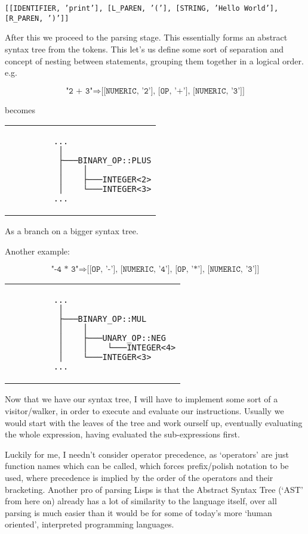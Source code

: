 \documentclass{article}
\newcommand{\code}[1]{\texttt{#1}}
\begin{document}
    \noindent\code{[[IDENTIFIER, 'print'], [L\_PAREN, '('], [STRING, 'Hello
    World'], [R\_PAREN, ')']]}

    After this we proceed to the parsing stage. This essentially forms an
    abstract syntax tree from the tokens. This let's us define some sort of
    separation and concept of nesting between statements, grouping them together
    in a logical order.\autocite{dragon}
    e.g.

    \[ \code{"2 + 3"} \Rightarrow \code{[[NUMERIC, '2'], [OP, '+'], [NUMERIC,
'3']]}  \]
    \centerline{becomes}
    \begin{center}
      \begin{tabular}{l}
        \begin{BVerbatim}
         ...
          │
          ├───BINARY_OP::PLUS
          │    │
          │    ├───INTEGER<2>
          │    └───INTEGER<3>
         ...
       \end{BVerbatim}
      \end{tabular}
      As a branch on a bigger syntax tree.
    \end{center}


    \centerline{Another example:}
    \[ \code{"-4 * 3"} \Rightarrow \code{[[OP, '-'], [NUMERIC, '4'], [OP, '*'],
[NUMERIC, '3']]}  \]
    \begin{center}
      \begin{tabular}{l}
        \begin{BVerbatim}
         ...
          │
          ├───BINARY_OP::MUL
          │    │
          │    ├───UNARY_OP::NEG
          │    │    └───INTEGER<4>
          │    └───INTEGER<3>
         ...
       \end{BVerbatim}
      \end{tabular}
    \end{center}


    Now that we have our syntax tree, I will have to implement some sort of a
    visitor/walker, in order to execute and evaluate our instructions. Usually
    we would start with the leaves of the tree and work ourself up,
    eventually evaluating the whole expression, having evaluated the
    sub-expressions first.

    Luckily for me, I needn't consider operator precedence, as `operators' are
    just function names which can be called, which forces prefix/polish notation
    to be used, where precedence is implied by the order of the operators and
    their bracketing. Another
    pro of parsing Lisps is that the Abstract Syntax Tree (`AST' from here on)
    already has a lot of similarity to the language itself, over all parsing is
    much easier than it would be for some of today's more `human oriented',
    interpreted programming languages.
\end{document}
